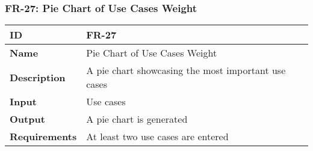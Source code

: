     

    \subsubsection{FR-27: Pie Chart of Use Cases Weight}
    \begin{center}
        \begin{tabularx}{\textwidth}{|l|X|}
            \hline
            \textbf{ID} & FR-27 \\
            \hline
            \textbf{Name} & Pie Chart of Use Cases Weight \\
            \hline
            \textbf{Description} & A pie chart showcasing the most important use cases \\
            \hline
            \textbf{Input} & Use cases \\
            \hline
            \textbf{Output} & A pie chart is generated \\
            \hline
            \textbf{Requirements} & At least two use cases are entered \\
            \hline
        \end{tabularx}
    \end{center}
    
    

    \newpage
    
